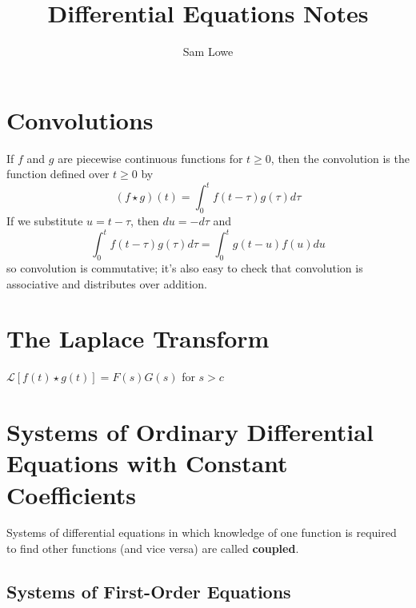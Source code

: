 \documentclass[12pt]{article}
\title{Differential Equations Notes}
\author{Sam Lowe}
\begin{document}
\maketitle

\tableofcontents

\pagebreak


\section{Convolutions}

If $f$ and $g$ are piecewise continuous functions for $t \geq 0$, then the convolution is the function defined over $t \geq 0$ by $$(f \star g)(t) = \int_0^t f(t-\tau)g(\tau)d\tau$$ If we substitute $u = t - \tau$, then $du = -d\tau$ and $$\int_0^t f(t-\tau)g(\tau)d\tau = \int_0^t g(t-u)f(u)du $$ so convolution is commutative; it's also easy to check that convolution is associative and distributes over addition.

\section{The Laplace Transform}

$\mathscr{L}[f(t) \star g(t)] = F(s)G(s)$ for $s > c$

\section{Systems of Ordinary Differential Equations with Constant Coefficients}

Systems of differential equations in which knowledge of one function is required to find other functions (and vice versa) are called \textbf{coupled}.

\subsection{Systems of First-Order Equations}
\end{document}
